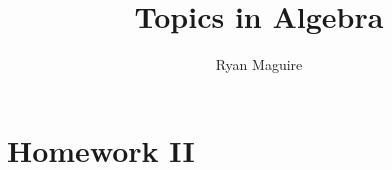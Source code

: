 \documentclass[crop=false,class=article]{standalone}                           %
\begin{document}
    \title{Topics in Algebra}
    \author{Ryan Maguire}
    \date{\vspace{-5ex}}
    \maketitle
    \tableofcontents
    \section{Homework II}
\end{document}
